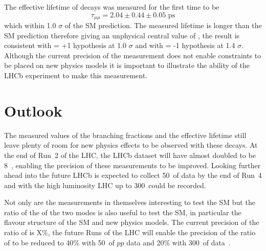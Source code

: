 The effective lifetime of \bsmumu decays was measured for the first time to be 
\begin{equation}
\tau_{\mu\mu} = 2.04 \pm 0.44 \pm 0.05 \text{ ps}
\end{equation}
which within 1.0 $\sigma$ of the SM prediction. The measured lifetime is longer than the SM prediction therefore giving an unphysical central value of \ADG, the result is consistent with \ADG = +1 hypothesis at 1.0 $\sigma$ and with \ADG = -1 hypothesis at 1.4 $\sigma$. Although the current precision of the measurement does not enable constraints to be placed on new physics models it is important to illustrate the ability of the LHCb experiment to make this measurement.


\section{Outlook}
The measured values of the branching fractions and the effective lifetime still leave plenty of room for new physics effects to be observed with these decays. At the end of Run~2 of the LHC, the LHCb dataset will have almost doubled to be 8~\fb, enabling the precision of these measurements to be improved. Looking further ahead into the future LHCb is expected to collect 50~\fb of data by the end of Run~4 and with the high luminosity LHC up to 300~\fb could be recorded. 

Not only are the \BF measurements in themselves interesting to test the SM but the ratio of the \BFs of the two modes is also useful to test the SM, in particular the flavour structure of the SM and new physics models. The current precision of the ratio of \BFs is X$\%$, the future Runs of the LHC will enable the precision of the ratio of \BFs to be reduced to 40$\%$ with 50~\fb of $pp$ data and 20$\%$ with 300~\fb of data~\cite{Aaij:2244311}. 

